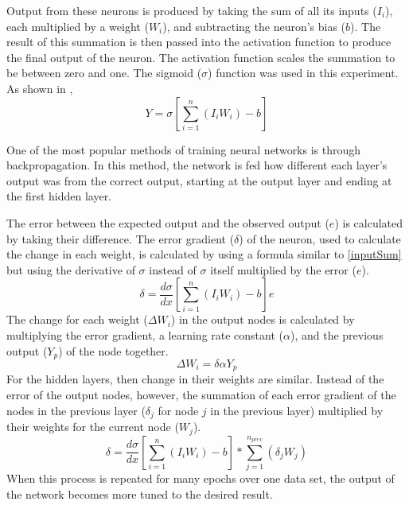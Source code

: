 \documentclass[12pt]{article}
\begin{document}
        Output from these neurons is produced by taking the sum of all its inputs (\(I_i\)), each multiplied by a weight (\(W_i\)), 
        and subtracting the neuron's bias (\(b\)).  The result of this summation is then passed into the activation function to produce 
        the final output of the neuron. The activation function scales the summation to be between zero and one.  
        The sigmoid (\(\sigma\)) function was used in this experiment. As shown in \cite{guideToIntSys},
        \begin{equation}\label{inputSum}
            Y = \sigma[\sum_{i=1}^{n} (I_i W_i) - b]
        \end{equation}

        One of the most popular methods of training neural networks is through backpropagation.  
        In this method, the network is fed how different each layer's output was from the correct output, 
        starting at the output layer and ending at the first hidden layer.

        The error between the expected output and the observed output (\(e\)) is calculated by taking their difference.
        The error gradient (\(\delta\)) of the neuron, used to calculate the change in each weight, is calculated by using a formula similar
        to \ref{inputSum} but using the derivative of \(\sigma\) instead of \(\sigma\) itself multiplied by the error (\(e\)).
        \begin{equation}\label{errGradient}
            \delta = \frac{d\sigma}{dx}[\sum_{i=1}^{n} (I_i W_i) - b] e
        \end{equation}
        The change for each weight (\(\Delta W_i\)) in the output nodes is calculated by multiplying the error gradient,
        a learning rate constant (\(\alpha\)), and the previous output (\(Y_p\)) of the node together.
        \begin{equation}\label{outputWeightDelta}
            \Delta W_i = \delta \alpha Y_p
        \end{equation}
        For the hidden layers, then change in their weights are similar.  Instead of the error of the output nodes, however,
        the summation of each error gradient of the nodes in the previous layer (\(\delta_j\) for node \(j\) in the previous layer) 
        multiplied by their weights for the current node (\(W_j\)).
        \begin{equation}\label{hiddenWeightDelta}
            \delta = \frac{d\sigma}{dx}[\sum_{i=1}^{n} (I_i W_i) - b]*\sum_{j=1}^{n_{prev}} (\delta_j W_j)
        \end{equation}
        When this process is repeated for many epochs over one data set, the output of the network becomes more
        tuned to the desired result.
\end{document}
